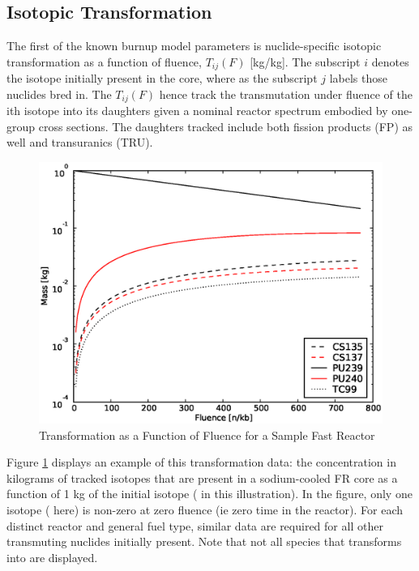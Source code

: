 \subsection{Isotopic Transformation}
\label{1g_sec:iso_transform}
The first of the known burnup model parameters is nuclide-specific isotopic transformation as a 
function of fluence, $T_{ij}(F)$ [kg/kg].  The subscript $i$ denotes 
the isotope initially present in the core, where as the subscript $j$ labels those nuclides bred in.  
The $T_{ij}(F)$ hence track the transmutation under fluence of the ith isotope into its daughters 
given a nominal reactor spectrum embodied by one-group cross sections.  The daughters tracked 
include both fission products (FP) as well and transuranics (TRU).

\begin{figure}[htbp]
\caption{ Transformation as a Function of Fluence for a Sample Fast Reactor}
\label{1g_fig01}
\begin{center}
\includegraphics[scale=0.5]{one_group_method/figs/Fig01.eps}
\end{center}
\end{figure}

Figure \ref{1g_fig01} displays an example of this transformation data: the concentration in 
kilograms of tracked isotopes that are present in a sodium-cooled FR core as a function of 1 kg 
of the initial isotope ( in this illustration).  In the figure, only one isotope 
( here) is non-zero at zero fluence (ie zero time in the reactor).  For each 
distinct reactor and general fuel type, similar data are required for all other transmuting 
nuclides initially present.   Note that not all species that  transforms into are displayed. 

